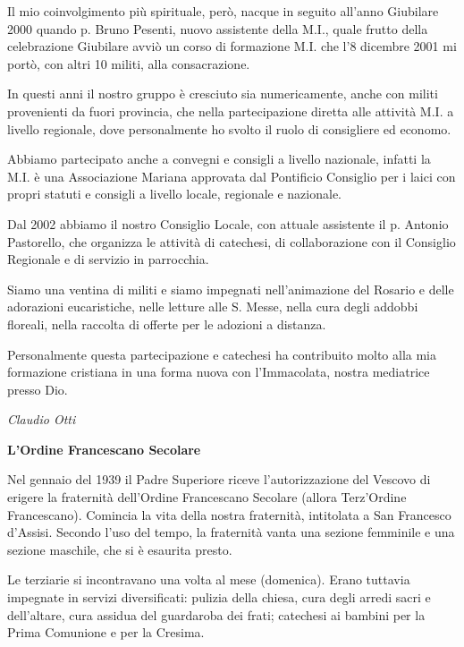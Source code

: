 Il mio coinvolgimento più spirituale, però, nacque in seguito all’anno Giubilare 2000 quando p. 
Bruno Pesenti, nuovo assistente della M.I., quale frutto della celebrazione Giubilare avviò un corso 
di formazione M.I. che l’8 dicembre 2001 mi portò, con altri 10 militi, alla consacrazione.

In questi anni il nostro gruppo è cresciuto sia numericamente, anche con militi provenienti da fuori 
provincia, che nella partecipazione diretta alle attività M.I. a livello regionale, dove personalmente 
ho svolto il ruolo di consigliere ed economo.

Abbiamo partecipato anche a convegni e consigli a livello nazionale, infatti la M.I. è una 
Associazione Mariana approvata dal Pontificio Consiglio per i laici con propri statuti e consigli a 
livello locale, regionale e nazionale.

Dal 2002 abbiamo il nostro Consiglio Locale, con attuale assistente il p. Antonio Pastorello, che 
organizza le attività di catechesi, di collaborazione con il Consiglio Regionale e di servizio in 
parrocchia.

Siamo una ventina di militi e siamo impegnati nell’animazione del Rosario e delle adorazioni 
eucaristiche, nelle letture alle S. Messe, nella cura degli addobbi floreali, nella raccolta di offerte 
per le adozioni a distanza.

Personalmente questa partecipazione e catechesi ha contribuito molto alla mia formazione cristiana 
in una forma nuova con l’Immacolata, nostra mediatrice presso Dio.
\begin{flushright}
\textit{Claudio Otti}
\end{flushright}
\bigskip
{}
{}
\begin{center}
\textbf{\Large L'Ordine Francescano Secolare}
\end{center}
\bigbreak
\noindent Nel gennaio del 1939 il Padre Superiore riceve l'autorizzazione del Vescovo di erigere la fraternità 
dell'Ordine Francescano Secolare (allora Terz’Ordine Francescano). Comincia la vita della nostra 
fraternità, intitolata a San Francesco d'Assisi. 
Secondo l'uso del tempo, la fraternità vanta una sezione femminile e  una sezione maschile, che si 
è esaurita presto. 

Le terziarie si incontravano una volta al mese (domenica). Erano tuttavia impegnate in servizi 
diversificati: pulizia della chiesa, cura degli arredi sacri e dell'altare, cura assidua del guardaroba 
dei frati; catechesi ai bambini per la Prima Comunione e per la Cresima. 

